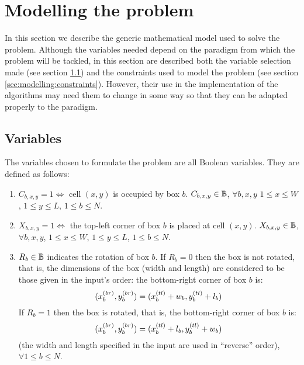 \section{Modelling the problem}
\label{sec:modelling}

In this section we describe the generic mathematical model used to solve the problem.
Although the variables needed depend on the paradigm from which the problem will
be tackled, in this section are described both the variable selection made (see section
\ref{sec:modelling:variables}) and the constraints used to model the problem (see section
\ref{sec:modelling:constraints}). However, their use in the implementation of the algorithms
may need them to change in some way so that they can be adapted properly to the paradigm.

\subsection{Variables}
\label{sec:modelling:variables}

The variables chosen to formulate the problem are all Boolean variables. They are defined
as follows:

\begin{enumerate}
    \item \label{var:box-cell} $C_{b,x,y} = 1 \Longleftrightarrow$ cell $(x,y)$ is occupied
    by box $b$. $C_{b,x,y} \in \mathbb{B}$, $\forall b,x,y$ $1 \le x \le W$, $1 \le y \le L$,
    $1 \le b \le N$.
    
    \item \label{var:box-corner} $X_{b,x,y} = 1 \Longleftrightarrow$ the top-left corner of
    box $b$ is placed at cell $(x,y)$. $X_{b,x,y} \in \mathbb{B}$, $\forall b,x,y$,
    $1 \le x \le W$, $1 \le y \le L$, $1 \le b \le N$.
    
    \item \label{var:box-rotated} $R_b \in \mathbb{B}$ indicates the rotation of box $b$. If
    $R_b = 0$ then the box is not rotated, that is, the dimensions of the box (width and
    length) are considered to be those given in the input's order: the bottom-right corner
    of box $b$ is:
    \begin{equation}
    \label{eq:box-rotation-0}
    (\Xbr, \Ybr) = (\Xtl + w_b, \Ytl + l_b)
    \end{equation}
    If $R_b = 1$ then the box is rotated, that is, the bottom-right corner of box $b$ is:
    \begin{equation}
    \label{eq:box-rotation-1}
    (\Xbr, \Ybr) = (\Xtl + l_b, \Ytl + w_b)
    \end{equation}
    (the width and length specified in the input are used in ``reverse'' order), 
    $\forall 1 \le b \le N$.
\end{enumerate}

